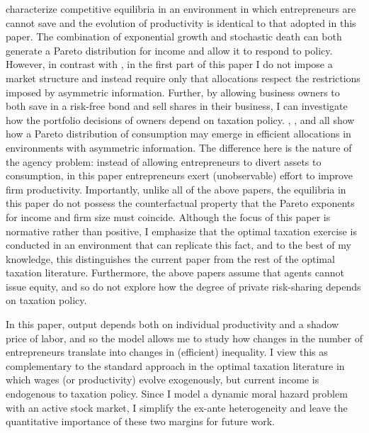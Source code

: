 \documentclass[11pt]{article}
\theoremstyle{plain}
\begin{document}
\cite{jones_schumpeterian_2018} characterize competitive equilibria in an environment in which entrepreneurs are cannot save and the evolution of productivity is identical to that adopted in this paper. The combination of exponential growth and stochastic death can both generate a Pareto distribution for income and allow it to respond to policy. However, in contrast with \cite{jones_schumpeterian_2018}, in the first part of this paper I do not impose a market structure and instead require only that allocations respect the restrictions imposed by asymmetric information. Further, by allowing business owners to both save in a risk-free bond and sell shares in their business, I can investigate how the portfolio decisions of owners depend on taxation policy. \cite{ai_quantitative_2022}, \cite{shourideh_optimal_2013}, and \cite{phelan_optimality_2022} all show how a Pareto distribution of consumption may emerge in efficient allocations in environments with asymmetric information. The difference here is the nature of the agency problem: instead of allowing entrepreneurs to divert assets to consumption, in this paper entrepreneurs exert (unobservable) effort to improve firm productivity. Importantly, unlike all of the above papers, the equilibria in this paper do not possess the counterfactual property that the Pareto exponents for income and firm size must coincide. Although the focus of this paper is normative rather than positive, I emphasize that the optimal taxation exercise is conducted in an environment that can replicate this fact, and to the best of my knowledge, this distinguishes the current paper from the rest of the optimal taxation literature. Furthermore, the above papers assume that agents cannot issue equity, and so do not explore how the degree of private risk-sharing depends on taxation policy. 


In this paper, output depends both on individual productivity and a shadow price of labor, and so the model allows me to study how changes in the number of entrepreneurs translate into changes in (efficient) inequality. I view this as complementary to the standard approach in the optimal taxation literature in which wages (or productivity) evolve exogenously, but current income is endogenous to taxation policy. Since I model a dynamic moral hazard problem with an active stock market, I simplify the ex-ante heterogeneity and leave the quantitative importance of these two margins for future work. 
\end{document}
